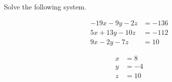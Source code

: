 
\begin{question}
Solve the following system.

\[\begin{aligned}
- 19 x - 9 y - 2 z&=-136\\
5 x + 13 y - 10 z&=-112\\
9 x - 2 y - 7 z&=10
\end{aligned}\]
\end{question}

\begin{solution}
\[\begin{aligned}
x&=8\\
y&=-4\\
z&=10
\end{aligned}\]
\end{solution}


